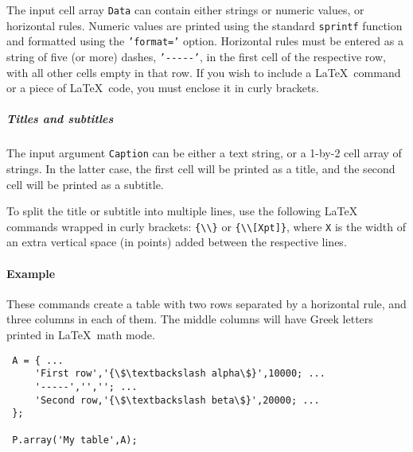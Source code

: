  The input cell array \texttt{Data} can contain either strings or numeric
 values, or horizontal rules. Numeric values are printed using the
 standard \texttt{sprintf} function and formatted using the
 \texttt{'format='} option. Horizontal rules must be entered as a string
 of five (or more) dashes, \texttt{'-{}-{}-{}-{}-'}, in the first cell of
 the respective row, with all other cells empty in that row. If you wish
 to include a \LaTeX~command or a piece of \LaTeX~code, you must enclose
 it in curly brackets.
 
 \subparagraph{Titles and subtitles}
 
 The input argument \texttt{Caption} can be either a text string, or a
 1-by-2 cell array of strings. In the latter case, the first cell will be
 printed as a title, and the second cell will be printed as a subtitle.
 
 To split the title or subtitle into multiple lines, use the following
 LaTeX commands wrapped in curly brackets:
 \texttt{\{\textbackslash{}\textbackslash{}\}} or
 \texttt{\{\textbackslash{}\textbackslash{}{[}Xpt{]}\}}, where \texttt{X}
 is the width of an extra vertical space (in points) added between the
 respective lines.
 
 \paragraph{Example}
 
 These commands create a table with two rows separated by a horizontal
 rule, and three columns in each of them. The middle columns will have
 Greek letters printed in \LaTeX~math mode.
 
 \begin{verbatim}
 A = { ...
     'First row','{\$\textbackslash alpha\$}',10000; ...
     '-----','',''; ...
     'Second row,'{\$\textbackslash beta\$}',20000; ...
 };
 
 P.array('My table',A);
 \end{verbatim}


